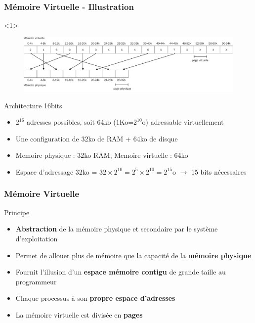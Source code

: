 \documentclass[8pt]{beamer}
\begin{document}
\begin{frame}[c]
    \frametitle{Mémoire Virtuelle - Illustration}
    \begin{onlyenv}<1>
        \vspace*{1.25cm}
        \begin{figure}
            \centering

            \includegraphics[height=.25\textwidth]{figures/memoire_virtuelle_physique.pdf}
        \end{figure}
    \end{onlyenv}
    \begin{exampleblock}{Architecture 16bits}
        \begin{itemize}
            \item  $2^{16}$ adresses possibles, soit 64ko
                  (1Ko=$2^{10}$o) adressable virtuellement
            \item Une configuration de 32ko de RAM + 64ko de disque
            \item Memoire physique : 32ko RAM, Memoire virtuelle : 64ko
            \item Espace d'adressage 32ko = $32 \times 2^{10} = 2^5
                      \times2^{10} = 2^{15}$o $\to$ 15 bits n\'ecessaires
        \end{itemize}
    \end{exampleblock}
\end{frame}

\begin{frame}
    \frametitle{Mémoire Virtuelle}
    \begin{block}{Principe}
        \begin{itemize}
            \item \textbf{Abstraction} de la mémoire physique et secondaire par
                  le système d'exploitation
            \item Permet de \fg{} allouer plus de mémoire
                  que la capacité de la \textbf{mémoire physique}
            \item Fournit l’illusion d’un \textbf{espace mémoire
                      contigu} de grande taille au programmeur
            \item Chaque processus \`a son \textbf{propre espace
                      d'adresses}
            \item La mémoire virtuelle est divisée en \textbf{pages}
        \end{itemize}
    \end{block}
\end{frame}
\end{document}
